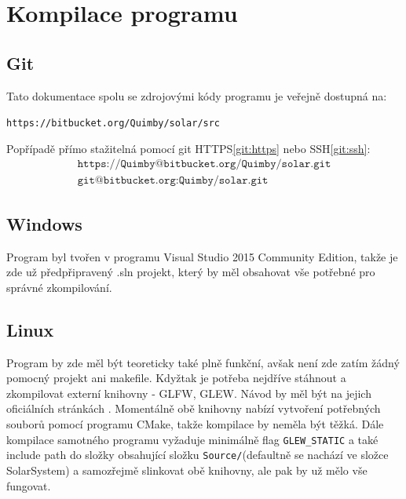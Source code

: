 \chapter{Kompilace programu}
\label{chap:kompilace}
\section{Git}
Tato dokumentace spolu se zdrojovými kódy programu je veřejně dostupná na:
\begin{center}
\texttt{https://bitbucket.org/Quimby/solar/src}
\end{center}
Popřípadě přímo stažitelná pomocí git HTTPS\eqref{git:https} nebo SSH\eqref{git:ssh}:
\begin{align}
	\label{git:https}
	\texttt{https://Quimby@bitbucket.org/Quimby/solar.git}\\
	\label{git:ssh}
	\texttt{git@bitbucket.org:Quimby/solar.git}
\end{align}
\section{Windows}
Program byl tvořen v programu Visual Studio 2015 Community Edition, takže je zde už předpřipravený .sln projekt, který by měl obsahovat vše potřebné pro správné zkompilování.
\section{Linux}
Program by zde měl být teoreticky také plně funkční, avšak není zde zatím žádný pomocný projekt ani makefile. Kdyžtak je potřeba nejdříve stáhnout a zkompilovat externí knihovny - GLFW, GLEW. Návod by měl být na jejich oficiálních stránkách . Momentálně obě knihovny nabízí vytvoření potřebných souborů pomocí programu CMake, takže kompilace by neměla být těžká. Dále kompilace samotného programu vyžaduje minimálně flag \texttt{GLEW\_STATIC} a také include path do složky obsahující složku \texttt{Source/}(defaultně se nachází ve složce SolarSystem) a samozřejmě slinkovat obě knihovny, ale pak by už mělo vše fungovat. 
